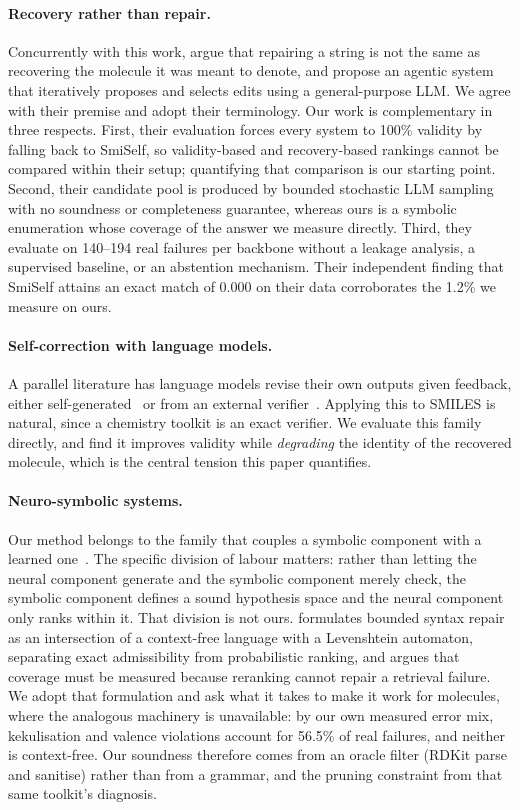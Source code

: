 \documentclass[11pt]{article}
\begin{document}
\paragraph{Recovery rather than repair.}
Concurrently with this work, \citet{amrec} argue that repairing a string is not
the same as recovering the molecule it was meant to denote, and propose an
agentic system that iteratively proposes and selects edits using a
general-purpose LLM. We agree with their premise and adopt their
terminology. Our work is complementary in three respects. First, their
evaluation forces every system to 100\% validity by falling back to SmiSelf, so
validity-based and recovery-based rankings cannot be compared within their
setup; quantifying that comparison is our starting point. Second, their
candidate pool is produced by bounded stochastic LLM sampling with no soundness
or completeness guarantee, whereas ours is a symbolic enumeration whose coverage
of the answer we measure directly. Third, they evaluate on 140--194 real
failures per backbone without a leakage analysis, a supervised baseline, or an
abstention mechanism. Their independent finding that SmiSelf attains an exact
match of 0.000 on their data corroborates the 1.2\% we measure on ours.

\paragraph{Self-correction with language models.}
A parallel literature has language models revise their own outputs given
feedback, either self-generated~\citep{madaan2023selfrefine} or from an external
verifier~\citep{gou2024critic,welleck2023generating}. Applying this to SMILES is
natural, since a chemistry toolkit is an exact verifier. We evaluate this family
directly, and find it improves validity while \emph{degrading} the identity of
the recovered molecule, which is the central tension this paper quantifies.

\paragraph{Neuro-symbolic systems.}
Our method belongs to the family that couples a symbolic component with a
learned one~\citep{garcez2023neurosymbolic}. The specific division of labour
matters: rather than letting the neural component generate and the symbolic
component merely check, the symbolic component defines a sound hypothesis space
and the neural component only ranks within it. That division is not ours.
\citet{considine2025syntax} formulates bounded syntax repair as an intersection
of a context-free language with a Levenshtein automaton, separating exact
admissibility from probabilistic ranking, and argues that coverage must be
measured because reranking cannot repair a retrieval failure. We adopt that
formulation and ask what it takes to make it work for molecules, where the
analogous machinery is unavailable: by our own measured error mix, kekulisation
and valence violations account for 56.5\% of real failures, and neither is
context-free. Our soundness therefore comes from an oracle filter (RDKit parse and sanitise)
rather than from a grammar, and the pruning constraint from that same toolkit's
diagnosis.
\end{document}
